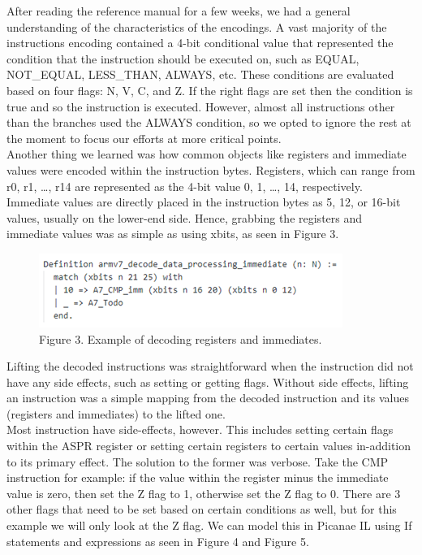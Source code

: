 \documentclass{article}
\begin{document}
\begin{multicols}{2}
After reading the reference manual for a few weeks, we had a general understanding of the characteristics of the encodings. A vast majority of the instructions encoding contained a 4-bit conditional value that represented the condition that the instruction should be executed on, such as EQUAL, NOT\_EQUAL, LESS\_THAN, ALWAYS, etc. These conditions are evaluated based on four flags: N, V, C, and Z. If the right flags are set then the condition is true and so the instruction is executed. However, almost all instructions other than the branches used the ALWAYS condition, so we opted to ignore the rest at the moment to focus our efforts at more critical points.\\

Another thing we learned was how common objects like registers and immediate values were encoded within the instruction bytes. Registers, which can range from r0, r1, …, r14 are represented as the 4-bit value 0, 1, …, 14, respectively. Immediate values are directly placed in the instruction bytes as 5, 12, or 16-bit values, usually on the lower-end side. Hence, grabbing the registers and immediate values was as simple as using xbits, as seen in Figure 3.\\

\begin{figure}[H]
\includegraphics[width=\linewidth]{decode_immediate_example.png}\\
Figure 3. Example of decoding registers and immediates.
\centering
\end{figure}

Lifting the decoded instructions was straightforward when the instruction did not have any side effects, such as setting or getting flags. Without side effects, lifting an instruction was a simple mapping from the decoded instruction and its values (registers and immediates) to the lifted one.\\

Most instruction have side-effects, however. This includes setting certain flags within the ASPR register or setting certain registers to certain values in-addition to its primary effect. The solution to the former was verbose. Take the CMP instruction for example: if the value within the register minus the immediate value is zero, then set the Z flag to 1, otherwise set the Z flag to 0. There are 3 other flags that need to be set based on certain conditions as well, but for this example we will only look at the Z flag. We can model this in Picanae IL using If statements and expressions as seen in Figure 4 and Figure 5.\\


\end{multicols}
\end{document}
